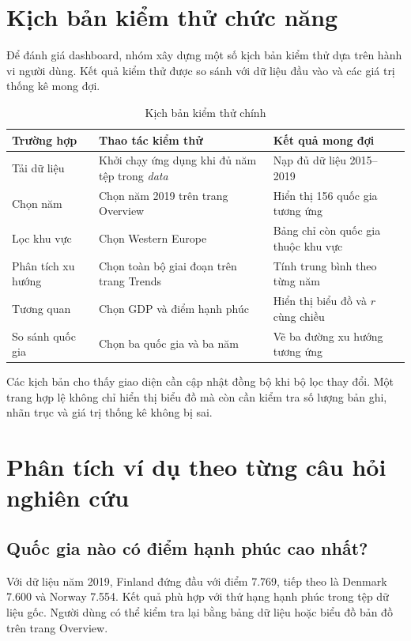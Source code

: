 \section{Kịch bản kiểm thử chức năng}

Để đánh giá dashboard, nhóm xây dựng một số kịch bản kiểm thử dựa trên hành vi người dùng. Kết quả kiểm thử được so sánh với dữ liệu đầu vào và các giá trị thống kê mong đợi.

\begin{table}[H]
\centering
\begin{tabular}{|p{3.2cm}|p{5.8cm}|p{3.5cm}|}
\hline
\textbf{Trường hợp} & \textbf{Thao tác kiểm thử} & \textbf{Kết quả mong đợi} \\
\hline
Tải dữ liệu & Khởi chạy ứng dụng khi đủ năm tệp trong \textit{data} & Nạp đủ dữ liệu 2015--2019 \\
\hline
Chọn năm & Chọn năm 2019 trên trang Overview & Hiển thị 156 quốc gia tương ứng \\
\hline
Lọc khu vực & Chọn Western Europe & Bảng chỉ còn quốc gia thuộc khu vực \\
\hline
Phân tích xu hướng & Chọn toàn bộ giai đoạn trên trang Trends & Tính trung bình theo từng năm \\
\hline
Tương quan & Chọn GDP và điểm hạnh phúc & Hiển thị biểu đồ và $r$ cùng chiều \\
\hline
So sánh quốc gia & Chọn ba quốc gia và ba năm & Vẽ ba đường xu hướng tương ứng \\
\hline
\end{tabular}
\caption{Kịch bản kiểm thử chính}
\label{tab:kich-ban-kiem-thu}
\end{table}

Các kịch bản cho thấy giao diện cần cập nhật đồng bộ khi bộ lọc thay đổi. Một trang hợp lệ không chỉ hiển thị biểu đồ mà còn cần kiểm tra số lượng bản ghi, nhãn trục và giá trị thống kê không bị sai.

\section{Phân tích ví dụ theo từng câu hỏi nghiên cứu}

\subsection{Quốc gia nào có điểm hạnh phúc cao nhất?}

Với dữ liệu năm 2019, Finland đứng đầu với điểm 7.769, tiếp theo là Denmark 7.600 và Norway 7.554. Kết quả phù hợp với thứ hạng hạnh phúc trong tệp dữ liệu gốc. Người dùng có thể kiểm tra lại bằng bảng dữ liệu hoặc biểu đồ bản đồ trên trang Overview.

